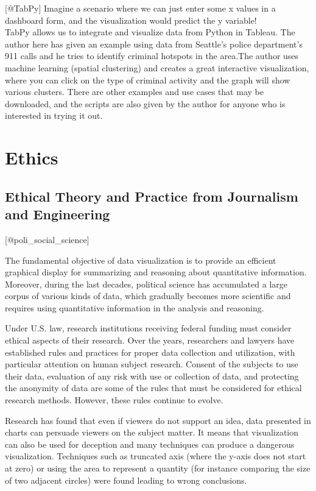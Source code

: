\documentclass[]{book}
\theoremstyle{definition}
\theoremstyle{definition}
\theoremstyle{definition}
\theoremstyle{remark}
\begin{document}
{[}@TabPy{]} Imagine a scenario where we can just enter some x values in
a dashboard form, and the visualization would predict the y variable!\\
TabPy allows us to integrate and visualize data from Python in Tableau.
The author here has given an example using data from Seattle's police
department's 911 calls and he tries to identify criminal hotspots in the
area.The author uses machine learning (spatial clustering) and creates a
great interactive visualization, where you can click on the type of
criminal activity and the graph will show various clusters. There are
other examples and use cases that may be downloaded, and the scripts are
also given by the author for anyone who is interested in trying it out.

\chapter{Ethics}\label{ethics}

\section{Ethical Theory and Practice from Journalism and
Engineering}\label{ethical-theory-and-practice-from-journalism-and-engineering}

{[}@poli\_social\_science{]}

The fundamental objective of data visualization is to provide an
efficient graphical display for summarizing and reasoning about
quantitative information. Moreover, during the last decades, political
science has accumulated a large corpus of various kinds of data, which
gradually becomes more scientific and requires using quantitative
information in the analysis and reasoning.

Under U.S. law, research institutions receiving federal funding must
consider ethical aspects of their research. Over the years, researchers
and lawyers have established rules and practices for proper data
collection and utilization, with particular attention on human subject
research. Consent of the subjects to use their data, evaluation of any
risk with use or collection of data, and protecting the anonymity of
data are some of the rules that must be considered for ethical research
methods. However, these rules continue to evolve.

Research has found that even if viewers do not support an idea, data
presented in charts can persuade viewers on the subject matter. It means
that visualization can also be used for deception and many techniques
can produce a dangerous visualization. Techniques such as truncated axis
(where the y-axis does not start at zero) or using the area to represent
a quantity (for instance comparing the size of two adjacent circles)
were found leading to wrong conclusions.
\end{document}

